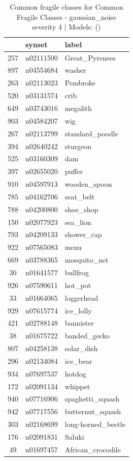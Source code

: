 \begin{table}
\caption{Common fragile classes for Common Fragile Classes - gaussian_noise severity 4 | Models: ()}
\label{tab:Common Fragile Classes - gaussian_noise severity 4_d41d8cd9}
\begin{tabular}{cll}
\toprule
 & synset & label \\
\midrule
257 & n02111500 & Great_Pyrenees \\
897 & n04554684 & washer \\
263 & n02113023 & Pembroke \\
520 & n03131574 & crib \\
649 & n03743016 & megalith \\
903 & n04584207 & wig \\
267 & n02113799 & standard_poodle \\
394 & n02640242 & sturgeon \\
525 & n03160309 & dam \\
397 & n02655020 & puffer \\
910 & n04597913 & wooden_spoon \\
785 & n04162706 & seat_belt \\
788 & n04200800 & shoe_shop \\
150 & n02077923 & sea_lion \\
793 & n04209133 & shower_cap \\
922 & n07565083 & menu \\
669 & n03788365 & mosquito_net \\
30 & n01641577 & bullfrog \\
926 & n07590611 & hot_pot \\
33 & n01664065 & loggerhead \\
929 & n07615774 & ice_lolly \\
421 & n02788148 & bannister \\
38 & n01675722 & banded_gecko \\
807 & n04258138 & solar_dish \\
296 & n02134084 & ice_bear \\
934 & n07697537 & hotdog \\
172 & n02091134 & whippet \\
940 & n07716906 & spaghetti_squash \\
942 & n07717556 & butternut_squash \\
303 & n02168699 & long-horned_beetle \\
176 & n02091831 & Saluki \\
49 & n01697457 & African_crocodile \\

\end{tabular}
\end{table}
